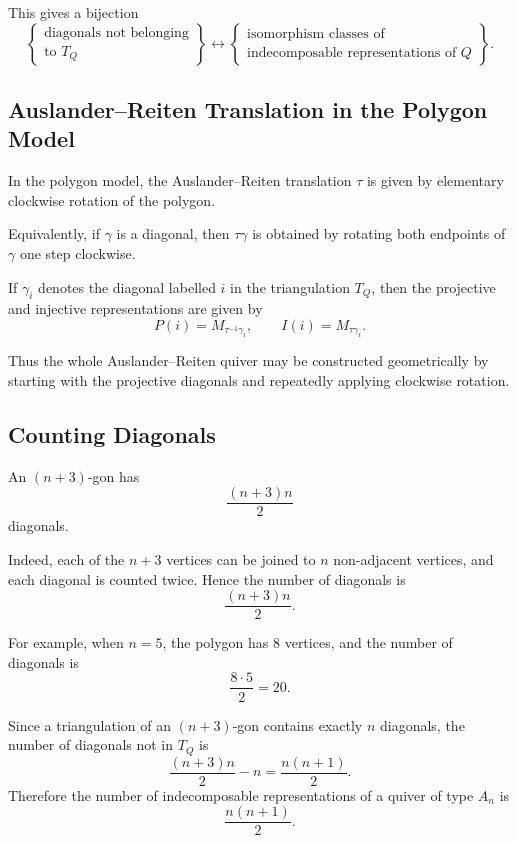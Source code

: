 \documentclass[11pt, a4paper]{report}
\begin{document}
This gives a bijection
\[
    \left\{
    \begin{array}{c}
        \text{diagonals not belonging}\\
        \text{to }T_Q
    \end{array}
    \right\}
    \longleftrightarrow
    \left\{
    \begin{array}{c}
        \text{isomorphism classes of}\\
        \text{indecomposable representations of }Q
    \end{array}
    \right\}.
\]

\subsection{Auslander--Reiten Translation in the Polygon Model}

In the polygon model, the Auslander--Reiten translation \(\tau\) is given by
elementary clockwise rotation of the polygon.

Equivalently, if \(\gamma\) is a diagonal, then \(\tau\gamma\) is obtained by
rotating both endpoints of \(\gamma\) one step clockwise.

If \(\gamma_i\) denotes the diagonal labelled \(i\) in the triangulation \(T_Q\),
then the projective and injective representations are given by
\[
    P(i)=M_{\tau^{-1}\gamma_i},
    \qquad
    I(i)=M_{\tau\gamma_i}.
\]

Thus the whole Auslander--Reiten quiver may be constructed geometrically by
starting with the projective diagonals and repeatedly applying clockwise rotation.

\subsection{Counting Diagonals}

An \((n+3)\)-gon has
\[
    \frac{(n+3)n}{2}
\]
diagonals.

Indeed, each of the \(n+3\) vertices can be joined to \(n\) non-adjacent vertices,
and each diagonal is counted twice. Hence the number of diagonals is
\[
    \frac{(n+3)n}{2}.
\]

For example, when \(n=5\), the polygon has \(8\) vertices, and the number of
diagonals is
\[
    \frac{8\cdot 5}{2}=20.
\]

Since a triangulation of an \((n+3)\)-gon contains exactly \(n\) diagonals, the
number of diagonals not in \(T_Q\) is
\[
    \frac{(n+3)n}{2}-n
    =
    \frac{n(n+1)}{2}.
\]
Therefore the number of indecomposable representations of a quiver of type
\(A_n\) is
\[
    \frac{n(n+1)}{2}.
\]
\end{document}
